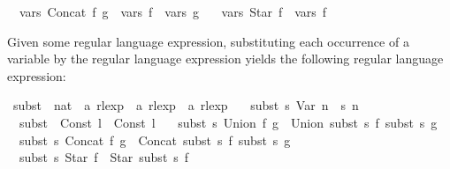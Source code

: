 \begin{isabellebody}
\ \ {\isachardoublequoteopen}vars\ {\isacharparenleft}{\kern0pt}Concat\ f\ g{\isacharparenright}{\kern0pt}\ {\isacharequal}{\kern0pt}\ vars\ f\ {\isasymunion}\ vars\ g{\isachardoublequoteclose}\ {\isacharbar}{\kern0pt}\isanewline
\ \ {\isachardoublequoteopen}vars\ {\isacharparenleft}{\kern0pt}Star\ f{\isacharparenright}{\kern0pt}\ {\isacharequal}{\kern0pt}\ vars\ f{\isachardoublequoteclose}%
\begin{isamarkuptext}%
Given some regular language expression, substituting each occurrence of a variable  by
the regular language expression  yields the following regular language expression:%
\end{isamarkuptext}\isamarkuptrue%
\isamarkupfalse%
\ subst\ {\isacharcolon}{\kern0pt}{\isacharcolon}{\kern0pt}\ {\isachardoublequoteopen}{\isacharparenleft}{\kern0pt}nat\ {\isasymRightarrow}\ {\isacharprime}{\kern0pt}a\ rlexp{\isacharparenright}{\kern0pt}\ {\isasymRightarrow}\ {\isacharprime}{\kern0pt}a\ rlexp\ {\isasymRightarrow}\ {\isacharprime}{\kern0pt}a\ rlexp{\isachardoublequoteclose}\ \isanewline
\ \ {\isachardoublequoteopen}subst\ s\ {\isacharparenleft}{\kern0pt}Var\ n{\isacharparenright}{\kern0pt}\ {\isacharequal}{\kern0pt}\ s\ n{\isachardoublequoteclose}\ {\isacharbar}{\kern0pt}\isanewline
\ \ {\isachardoublequoteopen}subst\ {\isacharunderscore}{\kern0pt}\ {\isacharparenleft}{\kern0pt}Const\ l{\isacharparenright}{\kern0pt}\ {\isacharequal}{\kern0pt}\ Const\ l{\isachardoublequoteclose}\ {\isacharbar}{\kern0pt}\isanewline
\ \ {\isachardoublequoteopen}subst\ s\ {\isacharparenleft}{\kern0pt}Union\ f\ g{\isacharparenright}{\kern0pt}\ {\isacharequal}{\kern0pt}\ Union\ {\isacharparenleft}{\kern0pt}subst\ s\ f{\isacharparenright}{\kern0pt}\ {\isacharparenleft}{\kern0pt}subst\ s\ g{\isacharparenright}{\kern0pt}{\isachardoublequoteclose}\ {\isacharbar}{\kern0pt}\isanewline
\ \ {\isachardoublequoteopen}subst\ s\ {\isacharparenleft}{\kern0pt}Concat\ f\ g{\isacharparenright}{\kern0pt}\ {\isacharequal}{\kern0pt}\ Concat\ {\isacharparenleft}{\kern0pt}subst\ s\ f{\isacharparenright}{\kern0pt}\ {\isacharparenleft}{\kern0pt}subst\ s\ g{\isacharparenright}{\kern0pt}{\isachardoublequoteclose}\ {\isacharbar}{\kern0pt}\isanewline
\ \ {\isachardoublequoteopen}subst\ s\ {\isacharparenleft}{\kern0pt}Star\ f{\isacharparenright}{\kern0pt}\ {\isacharequal}{\kern0pt}\ Star\ {\isacharparenleft}{\kern0pt}subst\ s\ f{\isacharparenright}{\kern0pt}{\isachardoublequoteclose}%
\isadelimdocument
%
\endisadelimdocument
%
\isatagdocument
%
\end{isabellebody}
